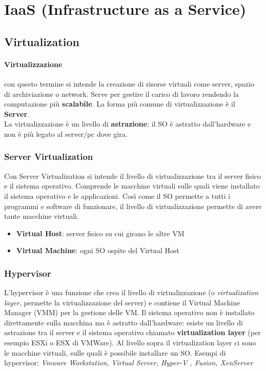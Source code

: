 \newpage
\section{IaaS (Infrastructure as a Service)}
\subsection{Virtualization}
\paragraph{Virtualizzazione} con questo termine si intende la creazione di risorse virtuali come server, spazio di archiviazione o network. Serve per gestire il carico di lavoro rendendo la computazione più \textbf{scalabile}. La forma più comune di virtualizzazione è il \textbf{Server}.\\
La virtualizzazione è un livello di \textbf{astrazione}: il SO è astratto dall'hardware e non è più legato al server/pc dove gira.

\subsubsection{Server Virtualization} Con Server Virtualization si intende il livello di virtualizzazione tra il server fisico e il sistema operativo. Comprende le macchine virtuali sulle quali viene installato il sistema operativo e le applicazioni. Così come il SO permette a tutti i programmi e software di funzionare, il livello di virtualizzazione permette di avere tante macchine virtuali.
\begin{itemize}
    \item \textbf{Virtual Host}: server fisico su cui girano le altre VM
    \item \textbf{Virtual Machine}: ogni SO ospite del Virtual Host
\end{itemize}

\subsubsection{Hypervisor} L'hypervisor è una funzione che crea il livello di virtualizzazione (o \textit{virtualization layer}, permette la virtualizzazione del server) e contiene il Virtual Machine Manager (VMM) per la gestione delle VM.
Il sistema operativo non è installato direttamente sulla macchina ma è astratto dall’hardware: esiste un livello di astrazione tra il server e il sistema operativo chiamato \textbf{virtualization layer} (per esempio ESXi o ESX di VMWare). 
Al livello sopra il virtualization layer ci sono le macchine virtuali, sulle quali è possibile installare un SO.
Esempi di hypervisor: \textit{Vmware Workstation, Virtual Server, Hyper-V , Fusion, XenServer}

